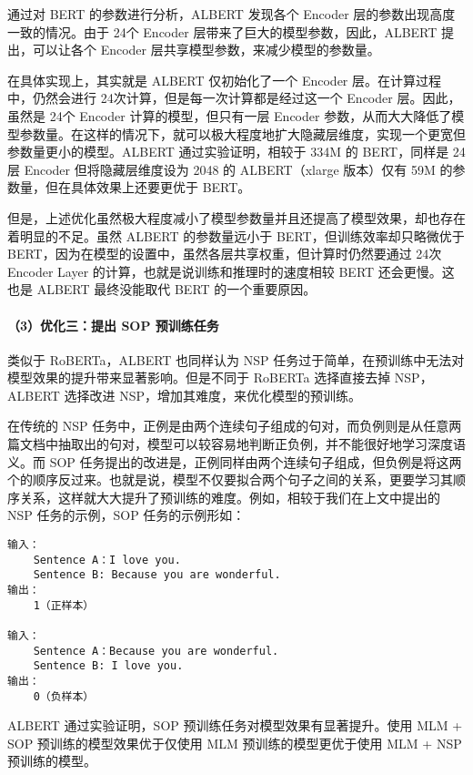 \documentclass[
]{article}
\begin{document}
通过对 BERT 的参数进行分析，ALBERT 发现各个 Encoder
层的参数出现高度一致的情况。由于 24个 Encoder
层带来了巨大的模型参数，因此，ALBERT 提出，可以让各个 Encoder
层共享模型参数，来减少模型的参数量。

在具体实现上，其实就是 ALBERT 仅初始化了一个 Encoder
层。在计算过程中，仍然会进行 24次计算，但是每一次计算都是经过这一个
Encoder 层。因此，虽然是 24个 Encoder 计算的模型，但只有一层 Encoder
参数，从而大大降低了模型参数量。在这样的情况下，就可以极大程度地扩大隐藏层维度，实现一个更宽但参数量更小的模型。ALBERT
通过实验证明，相较于 334M 的 BERT，同样是 24层 Encoder
但将隐藏层维度设为 2048 的 ALBERT（xlarge 版本）仅有 59M
的参数量，但在具体效果上还要更优于 BERT。

但是，上述优化虽然极大程度减小了模型参数量并且还提高了模型效果，却也存在着明显的不足。虽然
ALBERT 的参数量远小于 BERT，但训练效率却只略微优于
BERT，因为在模型的设置中，虽然各层共享权重，但计算时仍然要通过 24次
Encoder Layer 的计算，也就是说训练和推理时的速度相较 BERT
还会更慢。这也是 ALBERT 最终没能取代 BERT 的一个重要原因。

\paragraph{（3）优化三：提出 SOP
预训练任务}\label{ux4f18ux5316ux4e09ux63d0ux51fa-sop-ux9884ux8badux7ec3ux4efbux52a1}

类似于 RoBERTa，ALBERT 也同样认为 NSP
任务过于简单，在预训练中无法对模型效果的提升带来显著影响。但是不同于
RoBERTa 选择直接去掉 NSP，ALBERT 选择改进
NSP，增加其难度，来优化模型的预训练。

在传统的 NSP
任务中，正例是由两个连续句子组成的句对，而负例则是从任意两篇文档中抽取出的句对，模型可以较容易地判断正负例，并不能很好地学习深度语义。而
SOP
任务提出的改进是，正例同样由两个连续句子组成，但负例是将这两个的顺序反过来。也就是说，模型不仅要拟合两个句子之间的关系，更要学习其顺序关系，这样就大大提升了预训练的难度。例如，相较于我们在上文中提出的
NSP 任务的示例，SOP 任务的示例形如：

\begin{verbatim}
输入：
    Sentence A：I love you.
    Sentence B: Because you are wonderful.
输出：
    1（正样本）

输入：
    Sentence A：Because you are wonderful.
    Sentence B: I love you.
输出：
    0（负样本）
\end{verbatim}

ALBERT 通过实验证明，SOP 预训练任务对模型效果有显著提升。使用 MLM + SOP
预训练的模型效果优于仅使用 MLM 预训练的模型更优于使用 MLM + NSP
预训练的模型。
\end{document}
